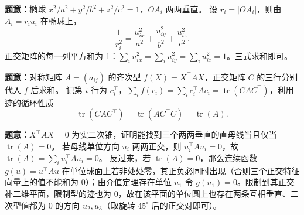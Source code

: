 \textbf{题意：}椭球 $x^2/a^2+y^2/b^2+z^2/c^2=1$，$OA_i$ 两两垂直。
设 $r_i=|OA_i|$，则由 $A_i=r_i u_i$ 在椭球上，
\[
\frac1{r_i^2}=\frac{u_{ix}^2}{a^2}+\frac{u_{iy}^2}{b^2}+\frac{u_{iz}^2}{c^2}.
\]
正交矩阵的每一列平方和为 1：$\sum_i u_{ix}^2=\sum_i u_{iy}^2=\sum_i u_{iz}^2=1$。三式求和即可。

\textbf{题意：}对称矩阵 $A=(a_{ij})$ 的齐次型 $f(X)=X^\top AX$，正交矩阵 $C$ 的三行分别代入 $f$ 后求和。
记第 $i$ 行为 $c_i^\top$，$\sum_i f(c_i)=\sum_i c_i^\top A c_i=\operatorname{tr}(CAC^\top)$，利用迹的循环性质
\[
\operatorname{tr}(CAC^\top)=\operatorname{tr}(AC^\top C)=\operatorname{tr}(A).
\]

\textbf{题意：}$X^\top AX=0$ 为实二次锥，证明能找到三个两两垂直的直母线当且仅当 $\operatorname{tr}(A)=0$。
若母线单位方向 $u_i$ 两两正交，则 $u_i^\top A u_i=0$，故 $\operatorname{tr}(A)=\sum_i u_i^\top A u_i=0$。
反过来，若 $\operatorname{tr}(A)=0$，那么连续函数 $g(u)=u^\top Au$ 在单位球面上若非处处零，其正负必同时出现（否则三个正交特征向量上的值不能和为 0）；由介值定理存在单位 $u_1$ 令 $g(u_1)=0$。限制到其正交补二维平面，限制型的迹也为 0，故在该平面的单位圆上也存在两条互相垂直、二次型值都为 0 的方向 $u_2,u_3$（取旋转 $45^\circ$ 后的正交对即可）。
